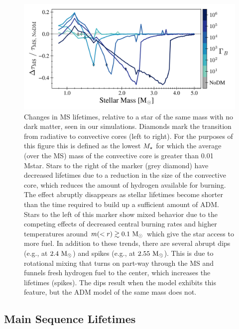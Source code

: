 \documentclass[useAMS,usenatbib]{mnras}
\begin{document}
\begin{figure}
  \centering
  \includegraphics[width=\textwidth]{plots/MStau.png}
  \caption{Changes in MS lifetimes, relative to a star of the same mass with no dark matter, seen in our simulations.
  Diamonds mark the transition from radiative to convective cores (left to right). For the purposes of this figure this is defined as the lowest $M_{\star}$ for which the average (over the MS) mass of the convective core is greater than 0.01 Mstar. Stars to the right of the \nodm marker (grey diamond) have decreased lifetimes due to a reduction in the size of the convective core, which reduces the amount of hydrogen available for burning. The effect abruptly disappears as stellar lifetimes become shorter than the time required to build up a sufficient amount of ADM. Stars to the left of this marker show mixed behavior due to the competing effects of decreased central burning rates and higher temperatures around $m(<r) \gtrsim 0.1 \ \mathrm{M}_{\odot}$ which give the star access to more fuel. In addition to these trends, there are several abrupt dips (e.g., at $2.4 \ \mathrm{M}_{\odot}$) and spikes (e.g., at $2.55 \ \mathrm{M}_{\odot}$). This is due to rotational mixing that turns on part-way through the MS and funnels fresh hydrogen fuel to the center, which increases the lifetimes (spikes). The dips result when the \nodm model exhibits this feature, but the ADM model of the same mass does not.
  }
  \label{fig:mstau}
\end{figure}

\subsection{Main Sequence Lifetimes}
\label{sub:mstau}
\end{document}

